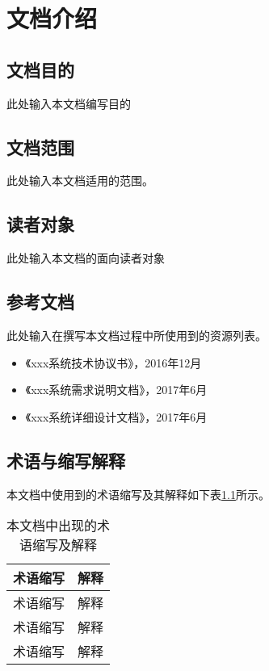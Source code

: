 \chapter{文档介绍}

\section{文档目的}
此处输入本文档编写目的

\section{文档范围}
此处输入本文档适用的范围。

\section{读者对象}
此处输入本文档的面向读者对象

\section{参考文档}
此处输入在撰写本文档过程中所使用到的资源列表。

\begin{itemize}
    \item 《xxx系统技术协议书》，2016年12月
    \item 《xxx系统需求说明文档》，2017年6月
    \item 《xxx系统详细设计文档》，2017年6月
\end{itemize}


\section{术语与缩写解释}

本文档中使用到的术语缩写及其解释如下表\ref{shuyu}所示。

\begin{table}[htb]
\centering
\label{shuyu}
\begin{tabular}{p{2cm}|p{8cm}}
\hline\hline

\textbf{术语缩写} & \textbf{解释} \\
\hline\hline

术语缩写 & 解释 \\
\hline

术语缩写 & 解释 \\
\hline

术语缩写 & 解释 \\
\hline

\hline\hline
\end{tabular}
\caption{本文档中出现的术语缩写及解释}
\end{table}
